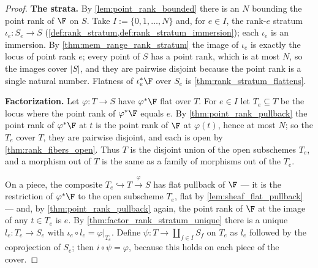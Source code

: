 \begin{proof}
  \leanok
  \textbf{The strata.}  By \cref{lem:point_rank_bounded} there is an \(N\)
  bounding the point rank of \(\F\) on \(S\).  Take
  \(I := \{0, 1, \dots, N\}\) and, for \(e \in I\), the rank-\(e\) stratum
  \(\iota_e : S_e \to S\)
  (\cref{def:rank_stratum,def:rank_stratum_immersion}); each \(\iota_e\) is
  an immersion.  By \cref{thm:mem_range_rank_stratum} the image of
  \(\iota_e\) is exactly the locus of point rank \(e\); every point of
  \(S\) has a point rank, which is at most \(N\), so the images cover
  \(|S|\), and they are pairwise disjoint because the point rank is a
  single natural number.  Flatness of \(\iota_e^*\F\) over \(S_e\) is
  \cref{thm:rank_stratum_flattens}.

  \textbf{Factorization.}  Let \(\varphi : T \to S\) have \(\varphi^*\F\)
  flat over \(T\).  For \(e \in I\) let \(T_e \subseteq T\) be the locus
  where the point rank of \(\varphi^*\F\) equals \(e\).  By
  \cref{thm:point_rank_pullback} the point rank of \(\varphi^*\F\) at \(t\)
  is the point rank of \(\F\) at \(\varphi(t)\), hence at most \(N\); so
  the \(T_e\) cover \(T\), they are pairwise disjoint, and each is open by
  \cref{thm:rank_fibers_open}.  Thus \(T\) is the disjoint union of the
  open subschemes \(T_e\), and a morphism out of \(T\) is the same as a
  family of morphisms out of the \(T_e\).

  On a piece, the composite
  \(T_e \hookrightarrow T \xrightarrow{\varphi} S\) has flat pullback of
  \(\F\) --- it is the restriction of \(\varphi^*\F\) to the open subscheme
  \(T_e\), flat by \cref{lem:sheaf_flat_pullback} --- and, by
  \cref{thm:point_rank_pullback} again, the point rank of \(\F\) at the
  image of any \(t \in T_e\) is \(e\).  By
  \cref{thm:factor_rank_stratum_unique} there is a unique
  \(l_e : T_e \to S_e\) with \(\iota_e \circ l_e = \varphi|_{T_e}\).
  Define \(\psi : T \to \coprod_{f \in I} S_f\) on \(T_e\) as \(l_e\)
  followed by the coprojection of \(S_e\); then \(i \circ \psi = \varphi\),
  because this holds on each piece of the cover.


\end{proof}
